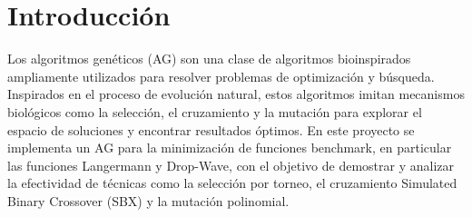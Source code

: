 \chapter{Introducción}
Los algoritmos genéticos (AG) son una clase de algoritmos bioinspirados ampliamente utilizados para resolver problemas de optimización y búsqueda. Inspirados en el proceso de evolución natural, estos algoritmos imitan mecanismos biológicos como la selección, el cruzamiento y la mutación para explorar el espacio de soluciones y encontrar resultados óptimos. En este proyecto se implementa un AG para la minimización de funciones benchmark, en particular las funciones Langermann y Drop-Wave, con el objetivo de demostrar y analizar la efectividad de técnicas como la selección por torneo, el cruzamiento Simulated Binary Crossover (SBX) y la mutación polinomial.
